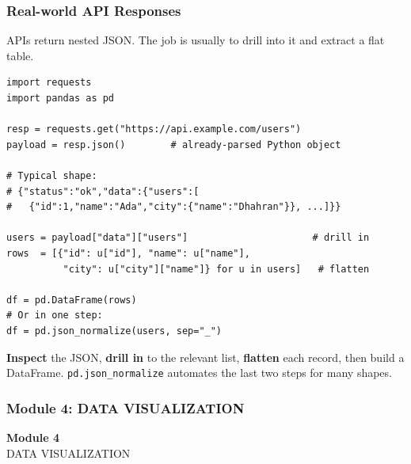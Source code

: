 \documentclass[aspectratio=169,10pt]{beamer}
\newcommand{\keyword}[1]{\textcolor{PrimaryBlue}{\textbf{#1}}}
\newcommand{\codeword}[1]{\texttt{#1}}
\begin{document}
\begin{frame}[fragile]
\frametitle{Real-world API Responses}
\small
APIs return nested JSON. The job is usually to drill into it and extract a flat table.

\vspace{0.08cm}
\begin{lstlisting}[style=pycodesmall]
import requests
import pandas as pd

resp = requests.get("https://api.example.com/users")
payload = resp.json()        # already-parsed Python object

# Typical shape:
# {"status":"ok","data":{"users":[
#   {"id":1,"name":"Ada","city":{"name":"Dhahran"}}, ...]}}

users = payload["data"]["users"]                      # drill in
rows  = [{"id": u["id"], "name": u["name"],
          "city": u["city"]["name"]} for u in users]   # flatten

df = pd.DataFrame(rows)
# Or in one step:
df = pd.json_normalize(users, sep="_")
\end{lstlisting}

\vspace{0.06cm}
\begin{tcolorbox}[lecturebox,title=The pattern]
\keyword{Inspect} the JSON, \keyword{drill in} to the relevant list, \keyword{flatten} each record, then build a DataFrame. \codeword{pd.json\_normalize} automates the last two steps for many shapes.
\end{tcolorbox}
\end{frame}


\begin{noheadline}
\begin{frame}
\frametitle{Module 4: DATA VISUALIZATION}
\vspace{1.2cm}
\begin{center}
  {\fontsize{30}{36}\selectfont\textbf{Module 4}}\\[0.35cm]
  {\fontsize{25}{30}\selectfont DATA VISUALIZATION}\\[0.7cm]
\end{center}
\end{frame}
\end{noheadline}
\end{document}
